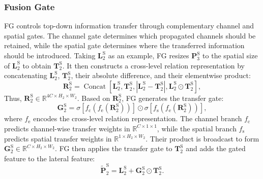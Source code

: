 \documentclass[runningheads]{llncs}
\begin{document}
\subsubsection{Fusion Gate}

FG controls top-down information transfer through complementary channel and spatial gates. The channel gate determines which propagated channels should be retained, while the spatial gate determines where the transferred information should be introduced. Taking $\mathbf{L}_{2}^{\mathrm{S}}$ as an example, FG resizes $\mathbf{P}_{3}^{\mathrm{S}}$ to the spatial size of $\mathbf{L}_{2}^{\mathrm{S}}$ to obtain $\mathbf{T}_{2}^{\mathrm{S}}$. It then constructs a cross-level relation representation by concatenating $\mathbf{L}_{2}^{\mathrm{S}}$, $\mathbf{T}_{2}^{\mathrm{S}}$, their absolute difference, and their elementwise product:
\begin{equation}
\mathbf{R}_{2}^{\mathrm{S}}
=
\operatorname{Concat}\!\left[
\mathbf{L}_{2}^{\mathrm{S}},
\mathbf{T}_{2}^{\mathrm{S}},
\left|\mathbf{L}_{2}^{\mathrm{S}}-\mathbf{T}_{2}^{\mathrm{S}}\right|,
\mathbf{L}_{2}^{\mathrm{S}}\odot\mathbf{T}_{2}^{\mathrm{S}}
\right],
\label{eq:fusion_relation}
\end{equation}
Thus, $\mathbf{R}_{2}^{\mathrm{S}} \in\mathbb{R}^{4C\times H_2\times W_2}$. Based on $\mathbf{R}_{2}^{\mathrm{S}}$, FG generates the transfer gate:
\begin{equation}
\mathbf{G}_{2}^{\mathrm{S}}
=
\sigma\!\left[
f_{\mathrm{c}}\!\left(f_{\mathrm{e}}(\mathbf{R}_{2}^{\mathrm{S}})\right)
\right]
\odot
\sigma\!\left[
f_{\mathrm{s}}\!\left(f_{\mathrm{e}}(\mathbf{R}_{2}^{\mathrm{S}})\right)
\right],
\label{eq:fusion_gate}
\end{equation}
where $f_{\mathrm{e}}$ encodes the cross-level relation representation. The channel branch $f_{\mathrm{c}}$ predicts channel-wise transfer weights in $\mathbb{R}^{C\times1\times1}$, while the spatial branch $f_{\mathrm{s}}$ predicts spatial transfer weights in $\mathbb{R}^{1\times H_2\times W_2}$. Their product is broadcast to form $\mathbf{G}_{2}^{\mathrm{S}} \in\mathbb{R}^{C\times H_2\times W_2}$. FG then applies the transfer gate to $\mathbf{T}_{2}^{\mathrm{S}}$ and adds the gated feature to the lateral feature:
\begin{equation}
\widetilde{\mathbf{P}}_{2}^{\mathrm{S}}
=
\mathbf{L}_{2}^{\mathrm{S}}
+
\mathbf{G}_{2}^{\mathrm{S}}
\odot
\mathbf{T}_{2}^{\mathrm{S}}.
\label{eq:fusion_output}
\end{equation}
\end{document}
